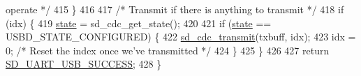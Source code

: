 \begin{DoxyCode}
{       operate */}
415     \}
416 
417     \textcolor{comment}{/* Transmit if there is anything to transmit */}
418     \textcolor{keywordflow}{if} (idx) \{
419         \mbox{\hyperlink{structsd__cbuf_aa88ff4ca3b7aaba9e9aaa27fd9ea94a9}{state}} = sd\_cdc\_get\_state();
420         
421         \textcolor{keywordflow}{if} (\mbox{\hyperlink{structsd__cbuf_aa88ff4ca3b7aaba9e9aaa27fd9ea94a9}{state}} == USBD\_STATE\_CONFIGURED) \{
422             \mbox{\hyperlink{group___s_d___u_s_b___c_d_c___i_f___functions_gabd3573e5083061a52edc3dcd98e6f827}{sd\_cdc\_transmit}}(txbuff, idx);
423             idx = 0;    \textcolor{comment}{/* Reset the index once we've transmitted */}
424         \}
425     \}
426 
427     \textcolor{keywordflow}{return} \mbox{\hyperlink{group___s_d___u_a_r_t___u_s_b___bridge___types_gga7e4773a8cce69fafe541cad55985f146a5f1ee74f25f6a6f1aa6b771dc91abe11}{SD\_UART\_USB\_SUCCESS}};
428 \}
\end{DoxyCode}
